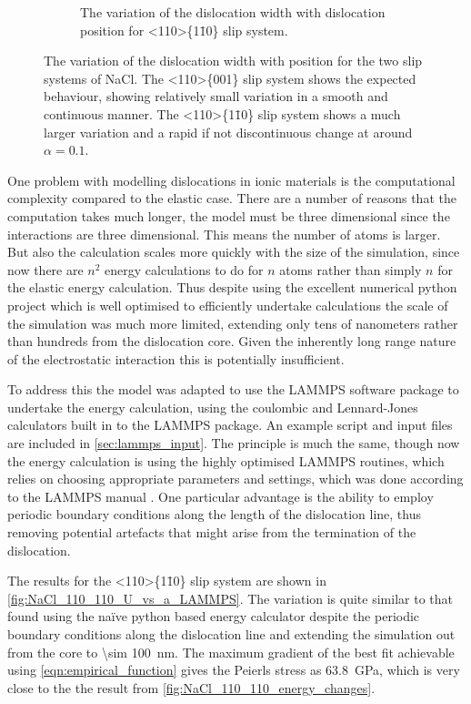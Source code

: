 \begin{figure}
\begin{subfigure}{0.4\textwidth}
\caption{The variation of the dislocation width with dislocation position for <110>\{1\={1}0\} slip system.\label{fig:NaCl_110_110_w_variation}}
\end{subfigure}
\caption[The variation of the dislocation width with position for the two slip systems of NaCl.]{The variation of the dislocation width with position for the two slip systems of NaCl. The <110>\{001\} slip system shows the expected behaviour, showing relatively small variation in a smooth and continuous manner. The <110>\{1\={1}0\} slip system shows a much larger variation and a rapid if not discontinuous change at around $\alpha=0.1$.\label{fig:NaCl_w_vs_alpha}}
\end{figure}

One problem with modelling dislocations in ionic materials is the computational complexity compared to the elastic case. There are a number of reasons that the computation takes much longer, the model must be three dimensional since the interactions are three dimensional. This means the number of atoms is larger. But also the calculation scales more quickly with the size of the simulation, since now there are $n^2$ energy calculations to do for $n$ atoms rather than simply $n$ for the elastic energy calculation. Thus despite using the excellent numerical python project \citep{Numpy2011} which is well optimised to efficiently undertake calculations the scale of the simulation was much more limited, extending only tens of nanometers rather than hundreds from the dislocation core. Given the inherently long range nature of the electrostatic interaction this is potentially insufficient.

To address this the model was adapted to use the LAMMPS \cite{LAMMPS_web} software package to undertake the energy calculation, using the coulombic and Lennard-Jones calculators built in to the LAMMPS package. An example script and input files are included in \autoref{sec:lammps_input}. The principle is much the same, though now the energy calculation is using the highly optimised LAMMPS routines, which relies on choosing appropriate parameters and settings, which was done according to the LAMMPS manual \cite{LAMMPS_web}. One particular advantage is the ability to employ periodic boundary conditions along the length of the dislocation line, thus removing potential artefacts that might arise from the termination of the dislocation.

The results for the <110>\{1\={1}0\} slip system are shown in \autoref{fig:NaCl_110_110_U_vs_a_LAMMPS}. The variation is quite similar to that found using the na\"ive python based energy calculator despite the periodic boundary conditions along the dislocation line and extending the simulation out from the core to \SI{\sim 100}{\nano\meter}. The maximum gradient of the best fit achievable using \autoref{eqn:empirical_function} gives the Peierls stress as \SI{63.8}{\giga\pascal}, which is very close to the the result from \autoref{fig:NaCl_110_110_energy_changes}. 


